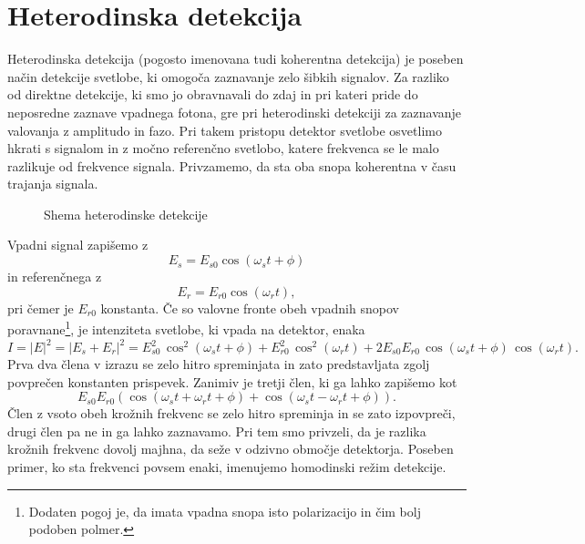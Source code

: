 \section{Heterodinska detekcija}
Heterodinska detekcija (pogosto imenovana tudi koherentna detekcija) je poseben način
detekcije svetlobe, ki omogoča zaznavanje zelo šibkih signalov. Za razliko od direktne detekcije,
ki smo jo obravnavali do zdaj in pri kateri pride do neposredne zaznave vpadnega fotona, 
gre pri heterodinski detekciji za zaznavanje valovanja z amplitudo in fazo. Pri takem 
pristopu detektor svetlobe osvetlimo hkrati s signalom in z močno referenčno svetlobo, 
katere frekvenca se le malo razlikuje od frekvence signala. Privzamemo, da sta oba snopa 
koherentna v času trajanja signala.
\begin{figure}[h]
\centering
\def\svgwidth{80truemm} 

\caption{Shema heterodinske detekcije}
\label{11_Hetero}
\end{figure}

Vpadni signal zapišemo z
\begin{equation}
E_s = E_{s0} \cos(\omega_st+\phi)
\end{equation}
in referenčnega z
\begin{equation}
E_r = E_{r0} \cos(\omega_rt),
\end{equation}
pri čemer je $E_{r0}$ konstanta. Če so valovne fronte obeh vpadnih snopov 
poravnane\footnote{Dodaten pogoj je, da imata vpadna snopa isto polarizacijo in čim bolj 
podoben polmer.}, je intenziteta svetlobe, 
ki vpada na detektor, enaka
\begin{equation}
I = |E|^2 = |E_s+E_r|^2 = E_{s0}^2 \, \cos^2(\omega_st+\phi)+
E_{r0}^2 \, \cos^2(\omega_rt) + 2E_{s0}E_{r0}\, \cos(\omega_st+\phi)\, \cos(\omega_rt).
\end{equation}
Prva dva člena v izrazu se zelo hitro spreminjata in zato predstavljata zgolj 
povprečen konstanten prispevek. 
Zanimiv je tretji člen, ki ga lahko zapišemo
kot
\begin{equation}
E_{s0}E_{r0}\left( \cos(\omega_st+\omega_rt+\phi)+\cos(\omega_st-\omega_rt+\phi)\right).
\end{equation}
Člen z vsoto obeh krožnih frekvenc se zelo hitro spreminja in se zato izpovpreči, 
drugi člen pa ne in ga lahko zaznavamo. 
Pri tem smo privzeli, da je razlika krožnih frekvenc dovolj majhna, da seže v odzivno območje
detektorja. Poseben primer, ko sta frekvenci povsem enaki, imenujemo homodinski režim 
detekcije. 

